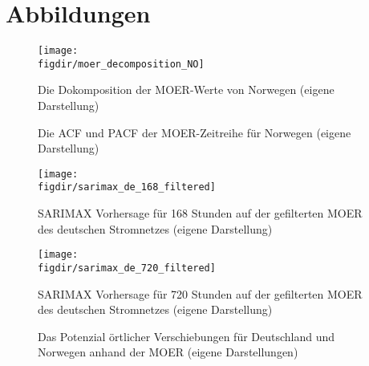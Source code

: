 \chapter{Abbildungen}\label{CAP:append-figures}
\begin{figure}
    \caption[Dekomposition der MOER Norwegens]{Die Dokomposition der MOER-Werte von Norwegen (eigene Darstellung)}
    {\texttt{[image: \\figdir/moer\_decomposition\_NO]}}
    \label{FIG:moer_decomposition_NO}
\end{figure}

\begin{figure}
    \centering
    \qquad
    \caption[ACF und PACF der MOER von Norwegen]{Die ACF und PACF der MOER-Zeitreihe für Norwegen (eigene Darstellung)}%
    \label{FIG:acf_pacf_moer_no}%
\end{figure}

\begin{figure}
    \caption[SARIMAX 168h Vorhersage MOER Deutschland gefiltert]{SARIMAX Vorhersage für 168 Stunden auf der gefilterten MOER des deutschen Stromnetzes (eigene Darstellung)}
    {\texttt{[image: \\figdir/sarimax\_de\_168\_filtered]}}
    \label{FIG:sarimax_de_168_filtered}
\end{figure}
\begin{figure}
    \caption[SARIMAX 72h Vorhersage MOER Deutschland gefiltert]{SARIMAX Vorhersage für 720 Stunden auf der gefilterten MOER des deutschen Stromnetzes (eigene Darstellung)}
    {\texttt{[image: \\figdir/sarimax\_de\_720\_filtered]}}
    \label{FIG:sarimax_de_720_filtered}
\end{figure}

\begin{figure}
    \centering
    \qquad
    \qquad
    \caption[Potenzial örtlicher Verschiebungen zwischen Deutschland und Norwegen]{Das Potenzial örtlicher Verschiebungen für Deutschland und Norwegen anhand der MOER (eigene Darstellungen)}%
    \label{FIG:location-shifting-potential}%
\end{figure}



